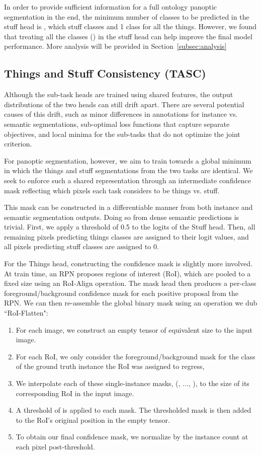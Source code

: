 \documentclass[10pt,twocolumn]{article}
\begin{document}
In order to provide sufficient information for a full ontology panoptic segmentation in the end, the minimum number of classes to be predicted in the stuff head is , which  stuff classes and 1 class for all the things. However, we found that treating all the classes () in the stuff head can help improve the final model performance. More analysis will be provided in Section~\ref{subsec:analysis}
\subsection{Things and Stuff Consistency (TASC)}

Although the sub-task heads are trained using shared features, the output distributions of the two heads can still drift apart. There are several potential causes of this drift, such as minor differences in annotations for instance vs. semantic segmentations, sub-optimal loss functions that capture separate objectives, and local minima for the sub-tasks that do not optimize the joint criterion.

For panoptic segmentation, however, we aim to train towards a global minimum in which the things and stuff segmentations from the two tasks are identical. We seek to enforce such a shared representation through an intermediate confidence mask reflecting which pixels each task considers to be things vs. stuff.


This mask can be constructed in a differentiable manner from both instance and semantic segmentation outputs. Doing so from dense semantic predictions is trivial. First, we apply a threshold of 0.5 to the logits of the Stuff head. Then, all remaining pixels predicting things classes are assigned to their logit values, and all pixels predicting stuff classes are assigned to 0.

For the Things head, constructing the confidence mask is slightly more involved. At train time, an \ac{RPN} proposes regions of interest (RoI), which are pooled to a fixed size using an RoI-Align operation. The mask head then produces a per-class foreground/background confidence mask for each positive  proposal from the \ac{RPN}. We can then re-assemble the global binary mask using an operation we dub ``RoI-Flatten": 

\begin{enumerate}
    \item For each image, we construct an empty tensor of equivalent size to the input image.
    \item For each RoI, we only consider the foreground/background mask for the class of the ground truth instance the RoI was assigned to regress, 
    \item We interpolate each of these single-instance masks, (, ..., ), to the size of its corresponding RoI in the input image.
    \item A threshold of  is applied to each mask. The thresholded mask is then added to the RoI's original position in the empty tensor.
    \item To obtain our final confidence mask, we normalize by the instance count at each pixel post-threshold.
\end{enumerate}
\end{document}
